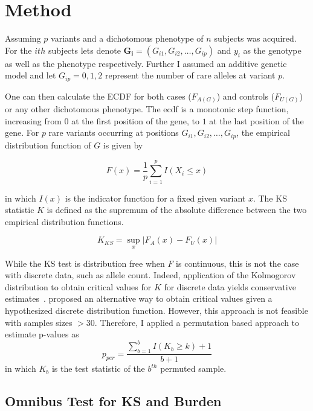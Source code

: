 \section{Method}
\label{sec:method_ksburden}

Assuming $p$ variants and a dichotomous phenotype of $n$ subjects was acquired.
For the $ith$ subjects lets denote $\bm{G_i} = (G_{i1}, G_{i2},\ldots , G_{ip})$ and $y_i$ as the genotype as well as the phenotype respectively.
Further I assumed an additive genetic model and let $G_{ip} = 0, 1, 2$ represent the number of rare alleles at variant $p$.  

One can then calculate the \acrfull{ECDF} for both cases ($F_{A(G)}$) and controls ($F_{U(G)}$) or any other dichotomous phenotype.
The ecdf is a monotonic step function, increasing from $0$ at the first position of the gene, to $1$ at the last position of the gene.
For $p$ rare variants occurring at positions  $G_{i1}, G_{i2}, \ldots, G_{ip}$, the empirical distribution function of $G$ is given by

\begin{equation}
  F(x) = \frac{1}{p}\sum^p_{i=1}I(X_i \leq x)
\end{equation}

in which $I(x)$ is the indicator function for a fixed given variant $x$.
The KS statistic $K$ is defined as the supremum of the absolute difference between the two empirical distribution functions.

\begin{equation}
	K_{KS} = \sup_x | F_A(x) - F_U(x) |
\end{equation}

While the KS test is distribution free when $F$ is continuous, this is not the case with discrete data, such as allele count.
Indeed, application of the Kolmogorov distribution to obtain critical values for $K$ for discrete data yields conservative estimates~\cite{Walsh1963,Conover1972}. 
\citet{Conover1972} proposed an alternative way to obtain critical values given a hypothesized discrete distribution function.
However, this approach is not feasible with samples sizes $>30$.
Therefore, I applied a permutation based approach to estimate p-values as 
\begin{equation}
  p_{per} = \frac{\sum^b_{b=1} I(K_b \geq k)+1}{b+1}
\end{equation}
in which $K_b$ is the test statistic of the $b^{th}$ permuted sample.

\subsection{Omnibus Test for KS and Burden}
\label{sub:omnibus_test_for_ks_and_burden}

